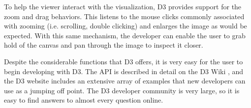 To help the viewer interact with the visualization, D3 provides support for the zoom and drag behaviors. This listens to the mouse clicks commonly associated with zooming (i.e. scrolling, double clicking) and enlarges the image as would be expected. With this same mechanism, the developer can enable the user to grab hold of the canvas and pan through the image to inspect it closer.

Despite the considerable functions that D3 offers, it is very easy for the user to begin developing with D3. The API is described in detail on the D3 Wiki \cite{D3Wiki}, and the D3 website \cite{D3} includes an extensive array of examples that new developers can use as a jumping off point. The D3 developer community is very large, so it is easy to find answers to almost every question online. 